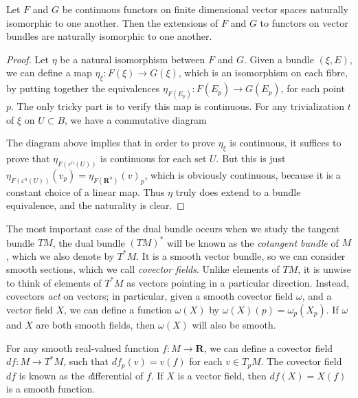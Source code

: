 \begin{theorem}
    Let $F$ and $G$ be continuous functors on finite dimensional vector spaces naturally isomorphic to one another. Then the extensions of $F$ and $G$ to functors on vector bundles are naturally isomorphic to one another.
\end{theorem}
\begin{proof}
    Let $\eta$ be a natural isomorphism between $F$ and $G$. Given a bundle $(\xi,E)$, we can define a map $\eta_\xi: F(\xi) \to G(\xi)$, which is an isomorphism on each fibre, by putting together the equivalences $\eta_{F(E_p)}: F(E_p) \to G(E_p)$, for each point $p$. The only tricky part is to verify this map is continuous. For any trivialization $t$ of $\xi$ on $U \subset B$, we have a commutative diagram
    \begin{center}
    \end{center}
    The diagram above implies that in order to prove $\eta_\xi$ is continuous, it suffices to prove that $\eta_{F(\varepsilon^n(U))}$ is continuous for each set $U$. But this is just $\eta_{F(\varepsilon^n(U))}(v_p) = \eta_{F(\mathbf{R}^n)}(v)_p$, which is obviously continuous, because it is a constant choice of a linear map. Thus $\eta$ truly does extend to a bundle equivalence, and the naturality is clear.
\end{proof}

The most important case of the dual bundle occurs when we study the tangent bundle $TM$, the dual bundle $(TM)^*$ will be known as the \emph{cotangent bundle} of $M$, which we also denote by $T^*M$. It is a smooth vector bundle, so we can consider smooth sections, which we call {\it covector fields}. Unlike elements of $TM$, it is unwise to think of elements of $T^*M$ as vectors pointing in a particular direction. Instead, covectors \emph{act} on vectors; in particular, given a smooth covector field $\omega$, and a vector field $X$, we can define a function $\omega(X)$ by $\omega(X)(p) = \omega_p(X_p)$. If $\omega$ and $X$ are both smooth fields, then $\omega(X)$ will also be smooth.

\begin{example}
    For any smooth real-valued function $f: M \to \mathbf{R}$, we can define a covector field $df: M \to T^*M$, such that $df_p(v) = v(f)$ for each $v \in T_pM$. The covector field $df$ is known as the {\emph differential} of $f$. If $X$ is a vector field, then $df(X) = X(f)$ is a smooth function.
\end{example}

